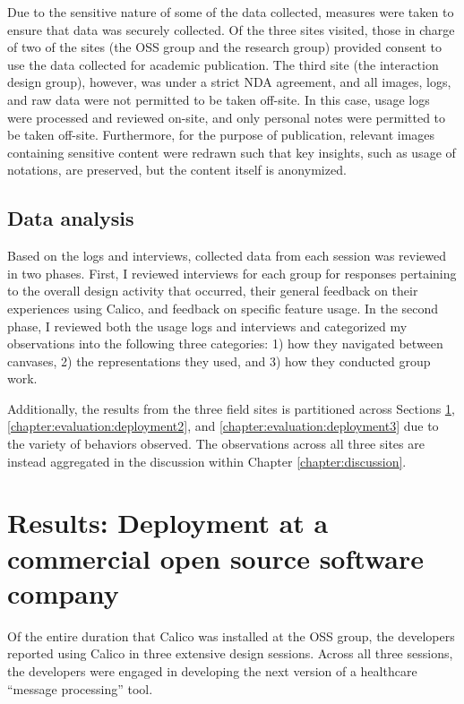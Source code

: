 Due to the sensitive nature of some of the data collected, measures were taken to ensure that data was securely collected. Of the three sites visited, those in charge of two of the sites (the OSS group and the research group) provided consent to use the data collected for academic publication. The third site (the interaction design group), however,  was under a strict NDA agreement, and all images, logs, and raw data were not permitted to be taken off-site. In this case, usage logs were processed and reviewed on-site, and only personal notes were permitted to be taken off-site. Furthermore, for the purpose of publication, relevant images containing sensitive content were redrawn such that key insights, such as usage of notations, are preserved, but the content itself is anonymized.

\subsection{Data analysis}

Based on the logs and interviews, collected data from each session was reviewed in two phases. First, I reviewed interviews for each group for responses pertaining to the overall design activity that occurred, their general feedback on their experiences using Calico, and feedback on specific feature usage. In the second phase, I reviewed both the usage logs and interviews and categorized my observations into the following three categories: 1) how they navigated between canvases, 2) the representations they used, and 3) how they conducted group work. 

Additionally, the results from the three field sites is partitioned across Sections \ref{chapter:evaluation:deployment1}, \ref{chapter:evaluation:deployment2}, and \ref{chapter:evaluation:deployment3} due to the variety of behaviors observed. The observations across all three sites are instead aggregated in the discussion within Chapter \ref{chapter:discussion}.

\section{Results: Deployment at a commercial open source software company}
\label{chapter:evaluation:deployment1}

Of the entire duration that Calico was installed at the OSS group, the developers reported using Calico in three extensive design sessions. Across all three sessions, the developers were engaged in developing the next version of a healthcare ``message processing'' tool. 


